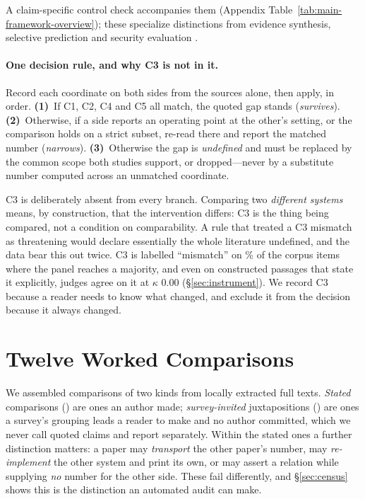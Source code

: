 \documentclass[11pt]{article}
\begin{document}
\noindent A claim-specific control check accompanies them (Appendix
Table~\ref{tab:main-framework-overview}); these specialize distinctions from
evidence synthesis, selective prediction and security evaluation
\citep{richardson1995pico,chow1970reject,papernot2018sok}.

\paragraph{One decision rule, and why C3 is not in it.}
Record each coordinate on both sides from the sources alone, then apply, in
order. \textbf{(1)}~If C1, C2, C4 and C5 all match, the quoted gap stands
(\emph{survives}). \textbf{(2)}~Otherwise, if a side reports an operating point
at the other's setting, or the comparison holds on a strict subset, re-read
there and report the matched number (\emph{narrows}). \textbf{(3)}~Otherwise the
gap is \emph{undefined} and must be replaced by the common scope both studies
support, or dropped---never by a substitute number computed across an unmatched
coordinate.

C3 is deliberately absent from every branch. Comparing two \emph{different
systems} means, by construction, that the intervention differs: C3 is the thing
being compared, not a condition on comparability. A rule that treated a C3
mismatch as threatening would declare essentially the whole literature
undefined, and the data bear this out twice. C3 is labelled ``mismatch'' on
\CThreeMismatchMaj\% of the corpus items where the panel reaches a majority, and
even on constructed passages
that state it explicitly, judges agree on it at $\kappa$ $0.00$
(\S\ref{sec:instrument}). We record C3 because a reader needs to know what
changed, and exclude it from the decision because it always changed.

\section{Twelve Worked Comparisons}
\label{sec:cases}

We assembled comparisons of two kinds from \FrameScreened{} locally extracted
full texts. \emph{Stated} comparisons (\LedgerStated{}) are ones an author made;
\emph{survey-invited} juxtapositions (\LedgerInvited{}) are ones a survey's
grouping leads a reader to make and no author committed, which we never call
quoted claims and report separately. Within the stated ones a further
distinction matters: a paper may \emph{transport} the other paper's number, may
\emph{re-implement} the other system and print its own, or may assert a relation
while supplying \emph{no} number for the other side. These fail differently, and
\S\ref{sec:census} shows this is the distinction an automated audit can make.
\end{document}
